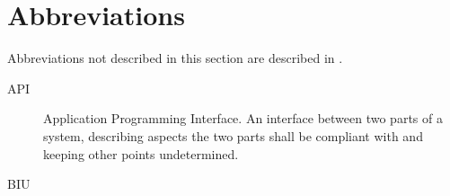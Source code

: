\section{Abbreviations}

Abbreviations not described in this section are described in
\cite{subset-023}.

\begin{description}
\item[API] Application Programming Interface. An interface between two
  parts of a system, describing aspects the two parts shall be
  compliant with and keeping other points undetermined.
\item [BIU] 
\end{description}

